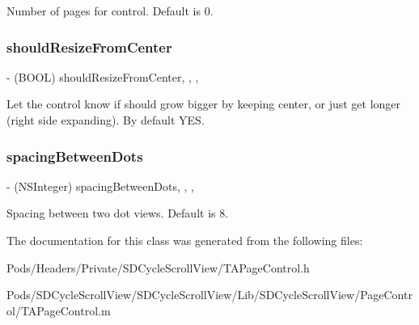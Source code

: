 Number of pages for control. Default is 0. \mbox{\label{interface_t_a_page_control_a61407e1cd357912bbbb96811bd060130}} 
\subsubsection{\texorpdfstring{should\+Resize\+From\+Center}{shouldResizeFromCenter}}
{\footnotesize\ttfamily -\/ (B\+O\+OL) should\+Resize\+From\+Center\hspace{0.3cm}{\ttfamily [read]}, {\ttfamily [write]}, {\ttfamily [nonatomic]}, {\ttfamily [assign]}}

Let the control know if should grow bigger by keeping center, or just get longer (right side expanding). By default Y\+ES. \mbox{\label{interface_t_a_page_control_ae983e795c6b95c240500127c46224e90}} 
\subsubsection{\texorpdfstring{spacing\+Between\+Dots}{spacingBetweenDots}}
{\footnotesize\ttfamily -\/ (N\+S\+Integer) spacing\+Between\+Dots\hspace{0.3cm}{\ttfamily [read]}, {\ttfamily [write]}, {\ttfamily [nonatomic]}, {\ttfamily [assign]}}

Spacing between two dot views. Default is 8. 

The documentation for this class was generated from the following files\+:\begin{DoxyCompactItemize}
\item 
Pods/\+Headers/\+Private/\+S\+D\+Cycle\+Scroll\+View/T\+A\+Page\+Control.\+h\item 
Pods/\+S\+D\+Cycle\+Scroll\+View/\+S\+D\+Cycle\+Scroll\+View/\+Lib/\+S\+D\+Cycle\+Scroll\+View/\+Page\+Control/T\+A\+Page\+Control.\+m\end{DoxyCompactItemize}

